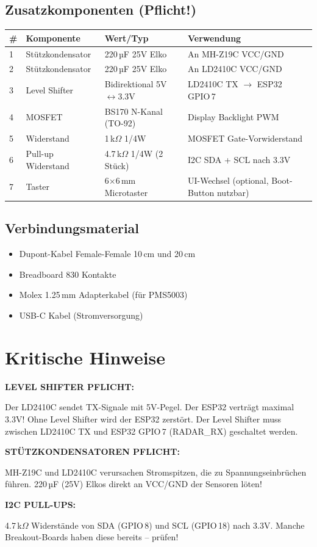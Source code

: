 \documentclass[a4paper,11pt]{article}
\begin{document}
\subsection{Zusatzkomponenten (Pflicht!)}

\begin{longtable}{p{0.5cm} p{3.5cm} p{3.5cm} p{5cm}}
\toprule
\rowcolor{tableheader}
\textbf{\#} & \textbf{Komponente} & \textbf{Wert/Typ} & \textbf{Verwendung} \\
\midrule
\endhead
1 & Stützkondensator & 220\,µF 25V Elko & An MH-Z19C VCC/GND \\
2 & Stützkondensator & 220\,µF 25V Elko & An LD2410C VCC/GND \\
3 & Level Shifter    & Bidirektional 5V$\leftrightarrow$3.3V & LD2410C TX $\rightarrow$ ESP32 GPIO\,7 \\
4 & MOSFET           & BS170 N-Kanal (TO-92) & Display Backlight PWM \\
5 & Widerstand       & 1\,k$\Omega$ 1/4W & MOSFET Gate-Vorwiderstand \\
6 & Pull-up Widerstand & 4.7\,k$\Omega$ 1/4W (2 Stück) & I2C SDA + SCL nach 3.3V \\
7 & Taster           & 6$\times$6\,mm Microtaster & UI-Wechsel (optional, Boot-Button nutzbar) \\
\bottomrule
\end{longtable}

\subsection{Verbindungsmaterial}

\begin{itemize}[leftmargin=2em]
    \item Dupont-Kabel Female-Female 10\,cm und 20\,cm
    \item Breadboard 830 Kontakte
    \item Molex 1.25\,mm Adapterkabel (für PMS5003)
    \item USB-C Kabel (Stromversorgung)
\end{itemize}

\section{Kritische Hinweise}

\textbf{LEVEL SHIFTER PFLICHT:}

Der LD2410C sendet TX-Signale mit 5V-Pegel. Der ESP32 verträgt maximal 3.3V! Ohne Level Shifter wird der ESP32 zerstört. Der Level Shifter muss zwischen LD2410C TX und ESP32 GPIO\,7 (RADAR\_RX) geschaltet werden.

\textbf{STÜTZKONDENSATOREN PFLICHT:}

MH-Z19C und LD2410C verursachen Stromspitzen, die zu Spannungseinbrüchen führen. 220\,µF (25V) Elkos direkt an VCC/GND der Sensoren löten!

\textbf{I2C PULL-UPS:}

4.7\,k$\Omega$ Widerstände von SDA (GPIO\,8) und SCL (GPIO\,18) nach 3.3V. Manche Breakout-Boards haben diese bereits -- prüfen!
\end{document}
